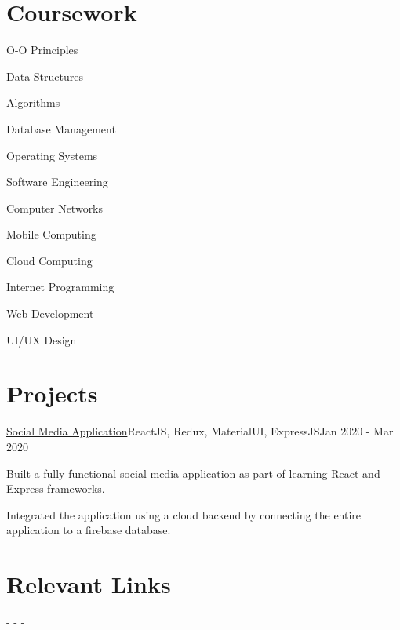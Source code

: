\documentclass[letterpaper]{resume_config}
\begin{document}
\section{Coursework}
\begin{SkillsList}{
    \item{O-O Principles}
    \item{Data Structures}
    \item{Algorithms}
    \item{Database Management}
    \item{Operating Systems}
    \item{Software Engineering}
    \item{Computer Networks}
    \item{Mobile Computing}
    \item{Cloud Computing}
    \item{Internet Programming}
    \item{Web Development}
    \item{UI/UX Design}
}
\end{SkillsList}

\section{Projects}
\Project
    {\href{https://github.com/yk-2310/Social-app}{Social Media Application}}{ReactJS, Redux, MaterialUI, ExpressJS}{Jan 2020 - Mar 2020}
    {
        \item {Built a fully functional social media application as part of learning React and Express frameworks.}
        \item {Integrated the application using a cloud backend by connecting the entire application to a firebase database.}
    }

\vspace{-5pt}
\section{Relevant Links}
-  
-  
- 
\end{document}
